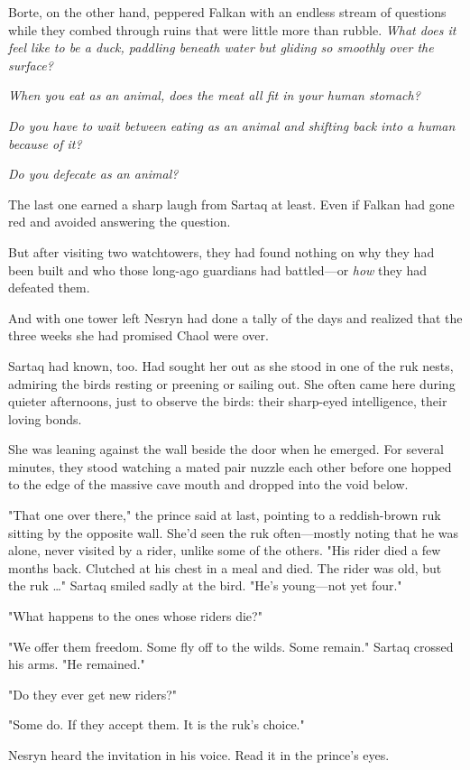 Borte, on the other hand, peppered Falkan with an endless stream of questions while they combed through ruins that were little more than rubble. \emph{What does it feel like to be a duck, paddling beneath water but gliding so smoothly over the surface?}

\emph{When you eat as an animal, does the meat all fit in your human stomach?}

\emph{Do you have to wait between eating as an animal and shifting back into a human because of it?}

\emph{Do you defecate as an animal?}

The last one earned a sharp laugh from Sartaq at least. Even if Falkan had gone red and avoided answering the question.

But after visiting two watchtowers, they had found nothing on why they had been built and who those long-ago guardians had battled---or
\emph{how} they had defeated them.

And with one tower left  Nesryn had done a tally of the days and realized that the three weeks she had promised Chaol were over.

Sartaq had known, too. Had sought her out as she stood in one of the ruk nests, admiring the birds resting or preening or sailing out. She often came here during quieter afternoons, just to observe the birds: their sharp-eyed intelligence, their loving bonds.

She was leaning against the wall beside the door when he emerged. For several minutes, they stood watching a mated pair nuzzle each other before one hopped to the edge of the massive cave mouth and dropped into the void below.

"That one over there," the prince said at last, pointing to a reddish-brown ruk sitting by the opposite wall. She'd seen the ruk often---mostly noting that he was alone, never visited by a rider, unlike some of the others. "His rider died a few months back. Clutched at his chest in a meal and died. The rider was old, but the ruk \ldots" Sartaq smiled sadly at the bird. "He's young---not yet four."

"What happens to the ones whose riders die?"

"We offer them freedom. Some fly off to the wilds. Some remain." Sartaq crossed his arms. "He remained."

"Do they ever get new riders?"

"Some do. If they accept them. It is the ruk's choice."

Nesryn heard the invitation in his voice. Read it in the prince's eyes.

